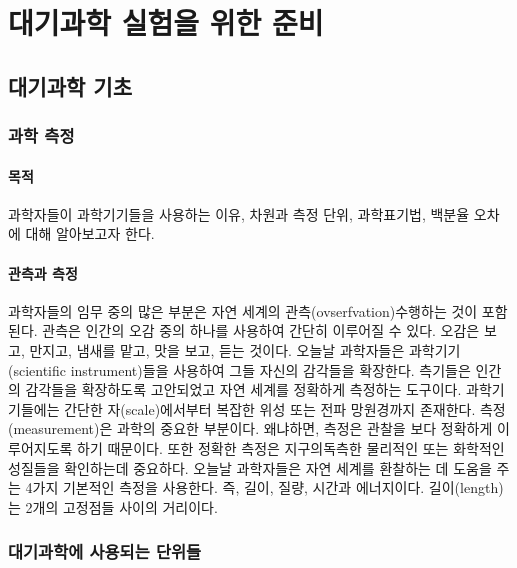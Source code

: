 
\part{대기과학 실험을 위한 준비}



\chapter{대기과학 기초}


\section{과학 측정}

\subsection{목적}

과학자들이 과학기기들을 사용하는 이유, 차원과 측정 단위, 과학표기법, 백분율 오차에 대해 알아보고자 한다.

\subsection{관측과 측정}

과학자들의 임무 중의 많은 부분은 자연 세계의 관측(ovserfvation)\을 수행하는 것이 포함된다. 관측은 인간의 오감 중의 하나를 사용하여 간단히 이루어질 수 있다. 오감은 보고, 만지고, 냄새를 맡고, 맛을 보고, 듣는 것이다. 오늘날 과학자들은 과학기기(scientific instrument)들을 사용하여 그들 자신의 감각들을 확장한다. 측기들은 인간의 감각들을 확장하도록 고안되었고 자연 세계를 정확하게 측정하는 도구이다. 과학기기들에는 간단한 자(scale)에서부터 복잡한 위성 또는 전파 망원경까지 존재한다. 측정(measurement)은 과학의 중요한 부분이다. 왜냐하면, 측정은 관찰을 보다 정확하게 이루어지도록 하기 때문이다.
또한 정확한 측정은 지구의독측한 물리적인 또는 화학적인 성질들을 확인하는데 중요하다. 오늘날 과학자들은 자연 세계를 환찰하는 데 도움을 주는 4가지 기본적인 측정을 사용한다. 즉, 길이, 질량, 시간과 에너지이다. 길이(length)는 2개의 고정점들 사이의 거리이다. 


\section{대기과학에 사용되는 단위들}

